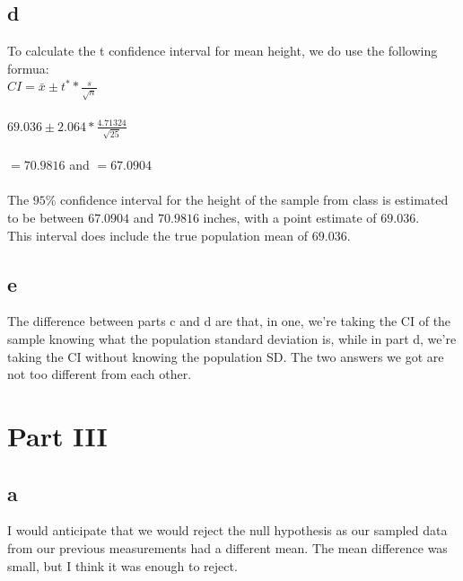 \documentclass[10pt,letterpaper]{article}
\begin{document}
\subsection*{d}
To calculate the t confidence interval for mean height, we do use the following
formua:\\
$CI=\bar{x}\pm t^* * \frac{s}{\sqrt{n}}$\\\\
$69.036 \pm 2.064*\frac{4.71324}{\sqrt{25}}$\\\\
$=70.9816$ and $=67.0904$\\\\
The $95\%$ confidence interval for the height of the sample from class is
estimated to be between $67.0904$ and $70.9816$ inches, with a point estimate
of $69.036$.\\
This interval does include the true population mean of $69.036$.\\

\subsection*{e}
The difference between parts c and d are that, in one, we're taking the CI of
the sample knowing what the population standard deviation is, while in part d,
we're taking the CI without knowing the population SD. The two answers we got
are not too different from each other.

\section*{Part III}
\subsection*{a}
I would anticipate that we would reject the null hypothesis as our sampled
data from our previous measurements had a different mean. The mean
difference was small, but I think it was enough to reject.
\end{document}
